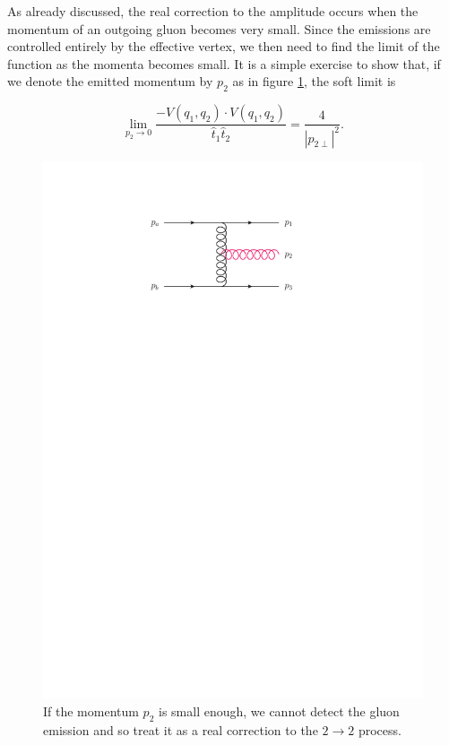 As already discussed, the real correction to the amplitude occurs when the momentum of an outgoing gluon becomes very small. Since the emissions are controlled entirely by the effective vertex, we then need to find the limit of the function as the momenta becomes small. It is a simple exercise to show that, if we denote the emitted momentum by $p_2$ as in figure \ref{fig:realcorrection}, the soft limit is

\begin{equation}
\lim_{p_2 \to 0} \frac{-V(q_1, q_2) \cdot V(q_1,q_2)}{\hat{t}_1 \hat{t}_2} = \frac{4}{|p_{2 \perp}|^2}.
\end{equation}

\begin{figure}[t]
\centering
\includegraphics[scale=1]{Images/real_correction.pdf} 
\caption{If the momentum $p_2$ is small enough, we cannot detect the gluon emission and so treat it as a real correction to the $2 \to 2$ process.}
\label{fig:realcorrection}
\end{figure}


